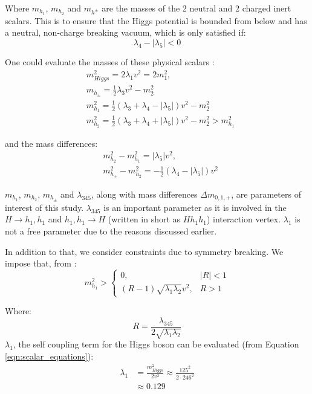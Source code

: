 \documentclass[12pt]{article}
\begin{document}
Where $m_{h_1}$, $m_{h_2}$ and $m_{h^\pm}$ are the masses of the 2 neutral and 2 charged inert scalars. This is to ensure that the Higgs potential is bounded from below and has a neutral, non-charge breaking vacuum, which is only satisfied if:
\begin{equation}
    \lambda_4 - |\lambda_5| < 0
\end{equation}

One could evaluate the masses of these physical scalars \cite{Belyaev:2016lok}:
\begin{align}
    \label{eqn:scalar_equations}
    &m_{Higgs}^2 = 2\lambda_1v^2 = 2m^2_1,\\
    &m_{h_\pm} = \frac{1}{2}\lambda_3v^2-m^2_2 \\
    \label{eqn:massdmscalar}
    &m_{h_1}^2 = \frac{1}{2}(\lambda_3 + \lambda_4 - |\lambda_5|)v^2 - m_2^2\\
    &m_{h_2}^2 = \frac{1}{2}(\lambda_3 + \lambda_4 + |\lambda_5|)v^2 - m_2^2 > m^2_{h_1}
\end{align}

and the mass differences: 
\begin{align}
    &m_{h_2}^2 - m_{h_1}^2 =  |\lambda_5|v^2, \\
    &m_{h_\pm}^2 - m_{h_2}^2 = -\frac{1}{2}(\lambda_4 - |\lambda_5|)v^2
\end{align}

$m_{h_1}$, $m_{h_2}$, $m_{h_\pm}$ and $\lambda_{345}$, along with mass differences $\Delta m_{0, 1, +}$, are parameters of interest of this study. $\lambda_{345}$ is an important parameter as it is involved in the $H\rightarrow h_1,h_1$ and $h_1,h_1 \rightarrow H$ (written in short as $Hh_1h_1$) interaction vertex. $\lambda_1$ is not a free parameter due to the reasons discussed earlier.

In addition to that, we consider constraints due to symmetry breaking. We impose that, from \cite{Belyaev:2016lok, Ginzburg2010}:
\begin{equation}
    m_{h_1}^2 >
        \begin{cases}
         0, & |R| < 1\\
         (R-1) \sqrt{\lambda_1\lambda_2} v^2, & R>1
        \end{cases}
        \label{eqn:R}
\end{equation}

Where:
\begin{equation}
    R = \frac{\lambda_{345}}{2\sqrt{\lambda_1\lambda_2}}
\end{equation}
$\lambda_1$, the self coupling term for the Higgs boson can be evaluated (from Equation \ref{eqn:scalar_equations}):
\begin{equation}
    \begin{split}
        \lambda_1 &= \frac{m^2_{Higgs}}{2 v^2}
                \approx\frac{125^2}{2\cdot 246 ^ 2} \\
                &\approx0.129
    \end{split}
\end{equation}
\end{document}
